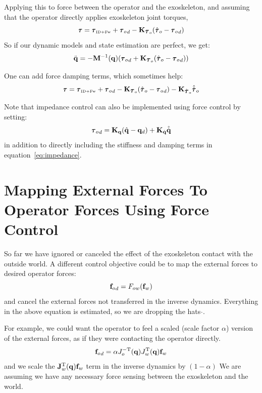 \documentclass[letterpaper,12pt,fullpage]{article}
\newcommand{\invdynw}{{\mbox {\tiny ID+Fw}}}
\begin{document}
Applying this to force between the operator and the exoskeleton, and assuming
that the operator directly applies exoskeleton joint torques,
\begin{equation}
\vtau = \vtau_{\invdynw} + {\vtau_o}_d - \mK_{\vtau_o} ( \hat{\vtau}_o - {\vtau_o}_d )
\end{equation}
So if our dynamic models and state estimation are perfect, we get:
\begin{equation}
\ddot{\vq} = - \mM^{-1} (\vq) ({\vtau_o}_d + \mK_{\vtau_o} ( \hat{\vtau}_o - {\vtau_o}_d ))
\end{equation}

One can add force damping terms, which sometimes help:
\begin{equation}
\vtau = \vtau_{\invdynw} + {\vtau_o}_d - \mK_{\vtau_o} ( \hat{\vtau}_o - {\vtau_o}_d )
- \mK_{\dot{\vtau}_o} \hat{\dot{\vtau}}_o
\end{equation}

Note that impedance control can also be implemented using force control
by setting:
\begin{equation}
{\vtau_o}_d = \mK_{\vq}( \hat{\vq} - \vq_d ) + \mK_{\dot{\vq}} \hat{\dot{\vq}}
\end{equation}
in addition to directly including the stiffness and damping terms in
equation~\ref{eq:impedance}. 

\section{Mapping External Forces To Operator Forces Using Force Control}

So far we have ignored or canceled the effect of 
the exoskeleton contact with the outside world.
A different control objective could be to map the external forces to 
desired operator forces:
\begin{equation}
{{\bf f}_o}_d = F_{ow} ( {\bf f}_w )
\end{equation}
and cancel the external forces not transferred in the inverse dynamics.
Everything in the above equation is estimated, so we are dropping the hats 
$\hat{\mbox{}}$.

For example, we could want the operator to feel a scaled (scale factor $\alpha$) 
version of the external
forces, as if they were contacting the operator directly.
\begin{equation}
{{\bf f}_o}_d = \alpha J_o^{-{\rm T}}({\bf q}) J_w^{{\rm T}}({\bf q}) {\bf f}_w
\end{equation}
and we scale the ${\bf J}_w^{{\rm T}}({\bf q}) {\bf f}_w$ term in the inverse dynamics
by $(1-\alpha)$
We are assuming we have any necessary force sensing between the exoskeleton and
the world.
\end{document}
